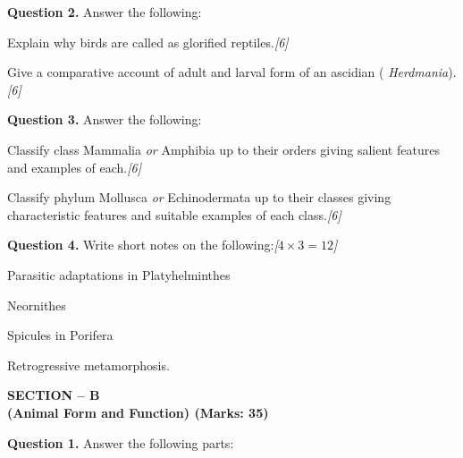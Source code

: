 \documentclass[11pt,a4paper]{article}
\newcommand{\pts}[1]{\hfill   \textit{[#1]}}
\begin{document}
\medskip


\noindent   \textbf{Question 2.} Answer the following:

\begin{parts}
  \item Explain why birds are called as glorified reptiles.\pts{6}
  \item Give a comparative account of adult and larval form of an ascidian (   \textit{Herdmania}).\pts{6}
\end{parts}

\medskip


\noindent   \textbf{Question 3.} Answer the following:

\begin{parts}
  \item Classify class Mammalia   \textit{or} Amphibia up to their orders giving salient features and examples of each.\pts{6}
  \item Classify phylum Mollusca   \textit{or} Echinodermata up to their classes giving characteristic features and suitable examples of each class.\pts{6}
\end{parts}

\pagebreak

\medskip


\noindent   \textbf{Question 4.} Write short notes on the following:\pts{$4  \times 3 = 12$}

\begin{parts}
  \item Parasitic adaptations in Platyhelminthes
  \item Neornithes
  \item Spicules in Porifera
  \item Retrogressive metamorphosis.
\end{parts}

\bigskip

\begin{center}
   \textbf{SECTION -- B} \\
   \textbf{(Animal Form and Function) (Marks: 35)}
\end{center}




\noindent   \textbf{Question 1.} Answer the following parts:
\end{document}

